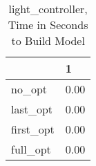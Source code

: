 \begin{table}
\caption{light\_controller, Time in Seconds to Build Model}
\label{light_controller_model_time}
\begin{tabular}{ll}
\toprule
 & 1 \\
\midrule
no\_opt & 0.00 \\
last\_opt & 0.00 \\
first\_opt & 0.00 \\
full\_opt & 0.00 \\
\bottomrule
\end{tabular}
\end{table}
